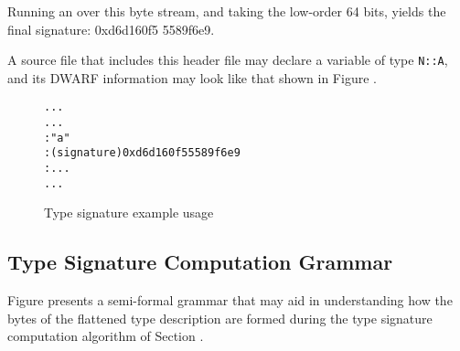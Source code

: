 Running an  over this byte stream, and taking the
low-order 64 bits, yields the final signature: 0xd6d160f5
5589f6e9.


A source file that includes this header file may declare a
variable of type \texttt{N::A}, and its DWARF information may look
like that shown in 
Figure .

\begin{figure}
\begin{dwflisting}
\begin{alltt}
  ...
    ...
       : "a"
       : (signature) 0xd6d160f5 5589f6e9
       : ...
    ...
\end{alltt}
\end{dwflisting}
\caption{Type signature example usage}
\label{fig:typesignatureexampleusage}
\end{figure}

\subsection{Type Signature Computation Grammar}
\label{app:typesignaturecomputationgrammar}

Figure 
presents a semi-formal grammar that may aid in understanding
how the bytes of the flattened type description are formed
during the type signature computation algorithm of
Section . 

